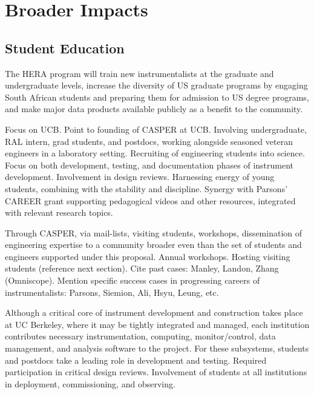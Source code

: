\documentclass[preprint]{aastex}
\begin{document}
\section{Broader Impacts} %


\subsection{Student Education}

The HERA program will train new instrumentalists at the graduate and undergraduate levels, increase the
diversity of US graduate programs by engaging South African students and preparing them for admission to US degree programs, and make major data products available publicly as a benefit to the community.

Focus on UCB. 
Point to founding of CASPER at UCB.
Involving undergraduate, RAL intern, grad students, and postdocs, working alongside seasoned veteran engineers in a laboratory setting.
Recruiting of engineering students into science.
Focus on both development, testing, and documentation phases of instrument development.  
Involvement in design reviews.
Harnessing energy of young students, combining with the stability and discipline.
Synergy with Parsons' CAREER grant supporting pedagogical videos and other resources, integrated with relevant
research topics.

Through CASPER, via mail-lists, visiting students, workshops, dissemination of engineering expertise to a community broader
even than the set of students and engineers supported under this proposal.
Annual workshops.
Hosting visiting students (reference next section). Cite past cases: Manley, Landon, Zhang (Omniscope).
Mention specific success cases in progressing careers of instrumentalists: Parsons, Siemion, Ali, Hsyu, Leung, etc.

Although a critical core of instrument development and construction takes place at UC Berkeley, where it may be tightly
integrated and managed, each institution contributes necessary instrumentation, computing, monitor/control, data management, and
analysis software to the project.  
For these subsystems, students and postdocs take a leading role in development and testing.
Required participation in critical design reviews.
Involvement of students at all institutions in deployment, commissioning, and observing.
\end{document}
